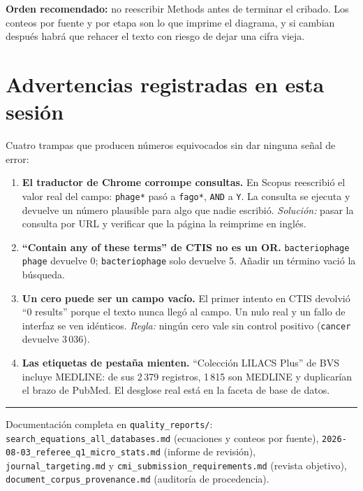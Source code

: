\documentclass[11pt,a4paper]{article}
\begin{document}
\textbf{Orden recomendado:} no reescribir Methods antes de terminar el cribado.
Los conteos por fuente y por etapa son lo que imprime el diagrama, y si cambian
después habrá que rehacer el texto con riesgo de dejar una cifra vieja.

\section{Advertencias registradas en esta sesión}

Cuatro trampas que producen números equivocados sin dar ninguna señal de error:

\begin{enumerate}[leftmargin=1.5em,itemsep=3pt]
\item \textbf{El traductor de Chrome corrompe consultas.} En Scopus reescribió el
valor real del campo: \texttt{phage*} pasó a \texttt{fago*}, \texttt{AND} a
\texttt{Y}. La consulta se ejecuta y devuelve un número plausible para algo que
nadie escribió. \emph{Solución:} pasar la consulta por URL y verificar que la
página la reimprime en inglés.
\item \textbf{``Contain any of these terms'' de CTIS no es un OR.}
\texttt{bacteriophage phage} devuelve 0; \texttt{bacteriophage} solo devuelve 5.
Añadir un término vació la búsqueda.
\item \textbf{Un cero puede ser un campo vacío.} El primer intento en CTIS
devolvió ``0 results'' porque el texto nunca llegó al campo. Un nulo real y un
fallo de interfaz se ven idénticos. \emph{Regla:} ningún cero vale sin control
positivo (\texttt{cancer} devuelve 3\,036).
\item \textbf{Las etiquetas de pestaña mienten.} ``Colección LILACS Plus'' de BVS
incluye MEDLINE: de sus 2\,379 registros, 1\,815 son MEDLINE y duplicarían el
brazo de PubMed. El desglose real está en la faceta de base de datos.
\end{enumerate}

\vspace{8pt}
\hrule
\vspace{6pt}
{\footnotesize Documentación completa en \texttt{quality\_reports/}:
\texttt{search\_equations\_all\_databases.md} (ecuaciones y conteos por fuente),
\texttt{2026-08-03\_referee\_q1\_micro\_stats.md} (informe de revisión),
\texttt{journal\_targeting.md} y \texttt{cmi\_submission\_requirements.md}
(revista objetivo), \texttt{document\_corpus\_provenance.md} (auditoría de
procedencia).}
\end{document}
